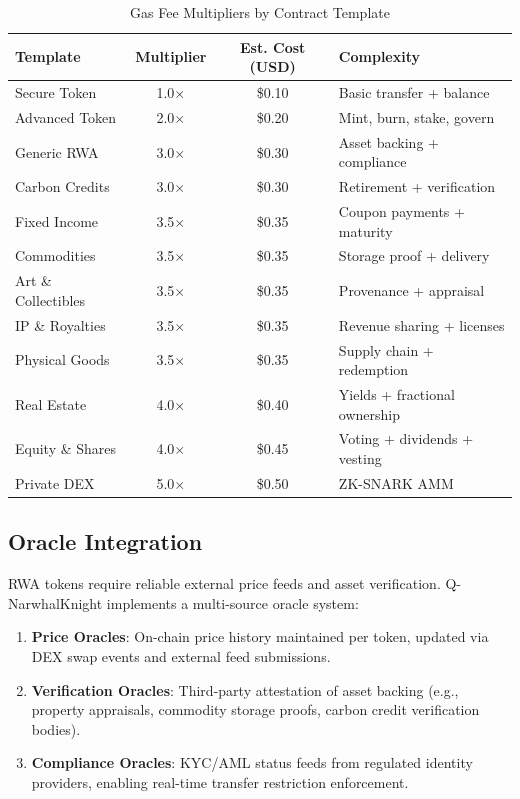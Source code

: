 \documentclass[11pt,a4paper,twoside]{article}
\begin{document}
\begin{table}[H]
\centering
\caption{Gas Fee Multipliers by Contract Template}
\label{tab:gas-multipliers}
\begin{tabular}{@{}lccl@{}}
\toprule
\textbf{Template} & \textbf{Multiplier} & \textbf{Est. Cost (USD)} & \textbf{Complexity} \\
\midrule
Secure Token       & 1.0$\times$ & \$0.10 & Basic transfer + balance \\
Advanced Token     & 2.0$\times$ & \$0.20 & Mint, burn, stake, govern \\
Generic RWA        & 3.0$\times$ & \$0.30 & Asset backing + compliance \\
Carbon Credits     & 3.0$\times$ & \$0.30 & Retirement + verification \\
Fixed Income       & 3.5$\times$ & \$0.35 & Coupon payments + maturity \\
Commodities        & 3.5$\times$ & \$0.35 & Storage proof + delivery \\
Art \& Collectibles & 3.5$\times$ & \$0.35 & Provenance + appraisal \\
IP \& Royalties    & 3.5$\times$ & \$0.35 & Revenue sharing + licenses \\
Physical Goods     & 3.5$\times$ & \$0.35 & Supply chain + redemption \\
Real Estate        & 4.0$\times$ & \$0.40 & Yields + fractional ownership \\
Equity \& Shares   & 4.0$\times$ & \$0.45 & Voting + dividends + vesting \\
Private DEX        & 5.0$\times$ & \$0.50 & ZK-SNARK AMM \\
\bottomrule
\end{tabular}
\end{table}

\subsection{Oracle Integration}

RWA tokens require reliable external price feeds and asset verification. Q-NarwhalKnight implements a multi-source oracle system:

\begin{enumerate}
  \item \textbf{Price Oracles}: On-chain price history maintained per token, updated via DEX swap events and external feed submissions.
  \item \textbf{Verification Oracles}: Third-party attestation of asset backing (e.g., property appraisals, commodity storage proofs, carbon credit verification bodies).
  \item \textbf{Compliance Oracles}: KYC/AML status feeds from regulated identity providers, enabling real-time transfer restriction enforcement.
\end{enumerate}
\end{document}
